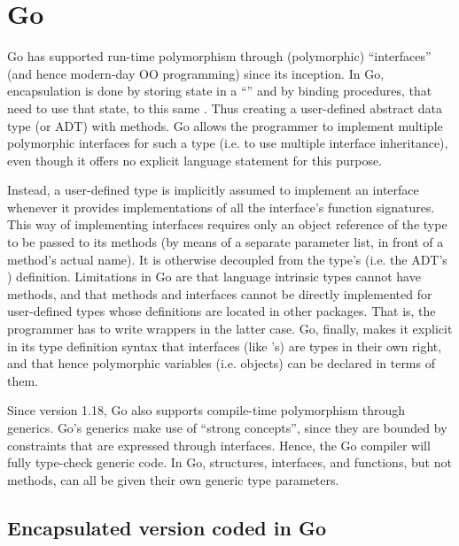 \documentclass[11pt,oneside]{report}
\newcommand{\code}[1]{{\selectfont\ttfamily{#1}}}
\begin{document}
\section{Go}

Go has supported run-time polymorphism through (polymorphic)
``interfaces'' (and hence modern-day OO programming) since its
inception. In Go, encapsulation is done by storing state in a
``\code{struct}'' and by binding procedures, that need to use that
state, to this same \code{struct}. Thus creating a user-defined
abstract data type (or ADT) with methods. Go allows the programmer to
implement multiple polymorphic interfaces for such a type (i.e. to use
multiple interface inheritance), even though it offers no explicit
language statement for this purpose.

Instead, a user-defined type is implicitly assumed to implement an
interface whenever it provides implementations of all the interface's
function signatures. This way of implementing interfaces requires only
an object reference of the type to be passed to its methods (by means
of a separate parameter list, in front of a method's actual name). It
is otherwise decoupled from the type's (i.e. the ADT's \code{struct})
definition. Limitations in Go are that language intrinsic types cannot
have methods, and that methods and interfaces cannot be directly
implemented for user-defined types whose definitions are located in
other packages. That is, the programmer has to write wrappers in the
latter case. Go, finally, makes it explicit in its type definition
syntax that interfaces (like \code{struct}'s) are types in their own
right, and that hence polymorphic variables (i.e. objects) can be
declared in terms of them.

Since version 1.18, Go also supports compile-time polymorphism through
generics. Go's generics make use of ``strong concepts'', since they
are bounded by constraints that are expressed through
interfaces. Hence, the Go compiler will fully type-check generic code.
In Go, structures, interfaces, and functions, but not methods, can all
be given their own generic type parameters.


\subsection{Encapsulated version coded in Go}
\end{document}
